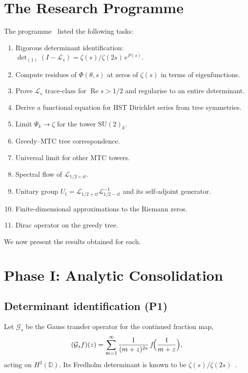 \documentclass[11pt,a4paper]{article}
\theoremstyle{remark}
\newcommand{\cL}{\mathcal{L}}
\newcommand{\cG}{\mathcal{G}}
\begin{document}
\section{The Research Programme}\label{sec:programme}
The programme~\cite{programme} listed the following tasks:
\begin{enumerate}[label=\bfseries P\arabic*:,ref=P\arabic*]
\item\label{P1} Rigorous determinant identification: $\det_{(1)}(I-\cL_s)=\zeta(s)/\zeta(2s)\,e^{P(s)}$.
\item\label{P2} Compute residues of $\Phi(\theta,s)$ at zeros of $\zeta(s)$ in terms of eigenfunctions.
\item\label{P3} Prove $\cL_s$ trace‑class for $\operatorname{Re}s>1/2$ and regularise to an entire determinant.
\item\label{P4} Derive a functional equation for HST Dirichlet series from tree symmetries.
\item\label{P5} Limit $\Psi_k\to\zeta$ for the tower $\mathrm{SU}(2)_k$.
\item\label{P6} Greedy–MTC tree correspondence.
\item\label{P7} Universal limit for other MTC towers.
\item\label{P8} Spectral flow of $\cL_{1/2+it}$.
\item\label{P9} Unitary group $U_t=\cL_{1/2+it}\cL_{1/2-it}^{-1}$ and its self‑adjoint generator.
\item\label{P10} Finite‑dimensional approximations to the Riemann zeros.
\item\label{P11} Dirac operator on the greedy tree.
\end{enumerate}
We now present the results obtained for each.

\section{Phase I: Analytic Consolidation}

\subsection{Determinant identification (P1)}
Let $\cG_s$ be the Gauss transfer operator for the continued fraction map,
\[
(\cG_s f)(z)=\sum_{m=1}^{\infty}\frac{1}{(m+z)^{2s}}\,f\!\Bigl(\frac{1}{m+z}\Bigr),
\]
acting on $H^2(\mathbb{D})$. Its Fredholm determinant is known to be $\zeta(s)/\zeta(2s)$~\cite{Mayer,Efrat}.
\end{document}
